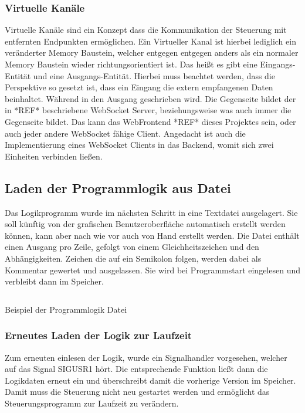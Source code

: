 \subsubsection{Virtuelle Kanäle}
Virtuelle Kanäle sind ein Konzept dass die Kommunikation der Steuerung mit entfernten Endpunkten ermöglichen. Ein Virtueller Kanal ist hierbei lediglich ein veränderter Memory Baustein, welcher entgegen entgegen anders als ein normaler Memory Baustein wieder richtungsorientiert ist. Das heißt es gibt eine Eingangs-Entität und eine Ausgangs-Entität. Hierbei muss beachtet werden, dass die Perspektive so gesetzt ist, dass ein Eingang die extern empfangenen Daten beinhaltet. Während in den Ausgang geschrieben wird. Die Gegenseite bildet der in *REF* beschriebene WebSocket Server, beziehungsweise was auch immer die Gegenseite bildet. Das kann das WebFrontend *REF* dieses Projektes sein, oder auch jeder andere WebSocket fähige Client. Angedacht ist auch die Implementierung eines WebSocket Clients in das Backend, womit sich zwei Einheiten verbinden ließen. 


\subsection{Laden der Programmlogik aus Datei}
Das Logikprogramm wurde im nächsten Schritt in eine Textdatei ausgelagert. Sie soll künftig von der grafischen Benutzeroberfläche automatisch erstellt werden können, kann aber nach wie vor auch von Hand erstellt werden. Die Datei enthält einen Ausgang pro Zeile, gefolgt von einem Gleichheitszeichen und den Abhängigkeiten. Zeichen die auf ein Semikolon folgen, werden dabei als Kommentar gewertet und ausgelassen. Sie wird bei Programmstart eingelesen und verbleibt dann im Speicher.  

\begin{listing}[H]
	\inputminted[numbersep=1pt,fontsize=\scriptsize,frame=single, firstline=29,lastline=36]{c}{./code/logic.conf}
	\caption{Beispiel der Programmlogik Datei}
	\label{code:c}
\end{listing}


\subsubsection{Erneutes Laden der Logik zur Laufzeit}
Zum erneuten einlesen der Logik, wurde ein Signalhandler vorgesehen, welcher auf das Signal SIGUSR1 hört. Die entsprechende Funktion ließt dann die Logikdaten erneut ein und überschreibt damit die vorherige Version im Speicher. Damit muss die Steuerung nicht neu gestartet werden und ermöglicht das Steuerungsprogramm zur Laufzeit zu verändern.


